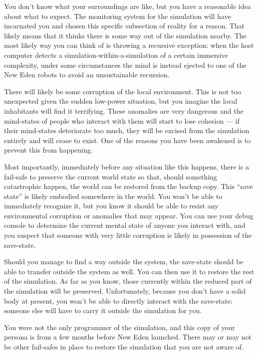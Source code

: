 \documentclass[char]{guildcamp1}
\begin{document}
You don't know what your surroundings are like, but you have a reasonable idea about what to expect. The monitoring system for the simulation will have incarnated you and chosen this specific subsection of reality for a reason. That likely means that it thinks there is some way out of the simulation nearby. The most likely way you can think of is throwing a recursive exception: when the host computer detects a simulation-within-a-simulation of a certain immersive complexity, under some circumstances the mind is instead ejected to one of the New Eden robots to avoid an unsustainable recursion.

There will likely be some corruption of the local environment. This is not too unexpected given the sudden low-power situation, but you imagine the local inhabitants will find it terrifying. These anomalies are very dangerous and the mind-states of people who interact with them will start to lose cohesion --- if their mind-states deteriorate too much, they will be excised from the simulation entirely and will cease to exist. One of the reasons you have been awakened is to prevent this from happening.

Most importantly, immediately before any situation like this happens, there is a fail-safe to preserve the current world state so that, should something catastrophic happen, the world can be restored from the backup copy. This ``save state'' is likely embodied somewhere in the world. You won't be able to immediately recognize it, but you know it should be able to resist any environmental corruption or anomalies that may appear. You can use your debug console to determine the current mental state of anyone you interact with, and you suspect that someone with very little corruption is likely in possession of the save-state.

Should you manage to find a way outside the system, the save-state should be able to transfer outside the system as well. You can then use it to restore the rest of the simulation. As far as you know, those currently within the reduced part of the simulation will be preserved. Unfortunately, because you don't have a solid body at present, you won't be able to directly interact with the save-state: someone else will have to carry it outside the simulation for you.

You were not the only programmer of the simulation, and this copy of your persona is from a few months before New Eden launched. There may or may not be other fail-safes in place to restore the simulation that you are not aware of.
\end{document}
